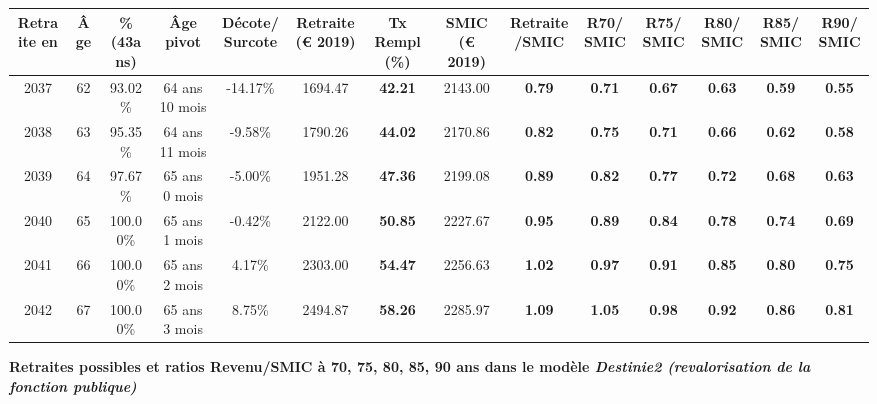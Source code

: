 \begin{adjustbox}{max width=\textwidth} 
\begin{tabular}[htb]{|c|c||c|c|c||c|c||c|c||c|c|c|c|c|} 
\hline 
 Retraite en &  Âge &  \%(43ans) &  Âge pivot &  Décote/Surcote &  Retraite (\euro{} 2019) &  Tx Rempl(\%) &  SMIC (\euro{} 2019) &  Retraite/SMIC &  R70/SMIC &  R75/SMIC &  R80/SMIC &  R85/SMIC &  R90/SMIC \\ 
\hline \hline 
 2037 &  62 &  93.02\% &  64 ans 10 mois &  -14.17\% &  1694.47 &  {\bf 42.21} &  2143.00 &  {\bf {\color{red} 0.79}} &  {\bf {\color{red} 0.71}} &  {\bf {\color{red} 0.67}} &  {\bf {\color{red} 0.63}} &  {\bf {\color{red} 0.59}} &  {\bf {\color{red} 0.55}} \\ 
\hline 
 2038 &  63 &  95.35\% &  64 ans 11 mois &  -9.58\% &  1790.26 &  {\bf 44.02} &  2170.86 &  {\bf {\color{red} 0.82}} &  {\bf {\color{red} 0.75}} &  {\bf {\color{red} 0.71}} &  {\bf {\color{red} 0.66}} &  {\bf {\color{red} 0.62}} &  {\bf {\color{red} 0.58}} \\ 
\hline 
 2039 &  64 &  97.67\% &  65 ans 0 mois &  -5.00\% &  1951.28 &  {\bf 47.36} &  2199.08 &  {\bf {\color{red} 0.89}} &  {\bf {\color{red} 0.82}} &  {\bf {\color{red} 0.77}} &  {\bf {\color{red} 0.72}} &  {\bf {\color{red} 0.68}} &  {\bf {\color{red} 0.63}} \\ 
\hline 
 2040 &  65 &  100.00\% &  65 ans 1 mois &  -0.42\% &  2122.00 &  {\bf 50.85} &  2227.67 &  {\bf {\color{red} 0.95}} &  {\bf {\color{red} 0.89}} &  {\bf {\color{red} 0.84}} &  {\bf {\color{red} 0.78}} &  {\bf {\color{red} 0.74}} &  {\bf {\color{red} 0.69}} \\ 
\hline 
 2041 &  66 &  100.00\% &  65 ans 2 mois &  4.17\% &  2303.00 &  {\bf 54.47} &  2256.63 &  {\bf 1.02} &  {\bf {\color{red} 0.97}} &  {\bf {\color{red} 0.91}} &  {\bf {\color{red} 0.85}} &  {\bf {\color{red} 0.80}} &  {\bf {\color{red} 0.75}} \\ 
\hline 
 2042 &  67 &  100.00\% &  65 ans 3 mois &  8.75\% &  2494.87 &  {\bf 58.26} &  2285.97 &  {\bf 1.09} &  {\bf 1.05} &  {\bf {\color{red} 0.98}} &  {\bf {\color{red} 0.92}} &  {\bf {\color{red} 0.86}} &  {\bf {\color{red} 0.81}} \\ 
\hline 
\hline 
\end{tabular} 
\end{adjustbox} 
 
 \vspace{0.1cm} 
{\bf \noindent Retraites possibles et ratios Revenu/SMIC à 70, 75, 80, 85, 90 ans dans le modèle \emph{Destinie2 (revalorisation de la fonction publique)}}  
 
